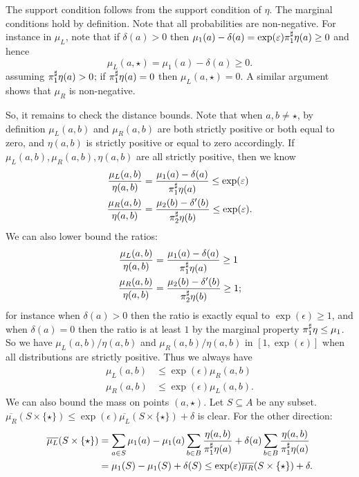 \documentclass{lmcs}
\begin{document}
  The support condition follows from the support condition of $\eta$. The
  marginal conditions hold by definition. Note that all probabilities are
  non-negative. For instance in $\mu_L$, note that if $\delta(a) > 0$ then
  $\mu_1(a) - \delta(a) = \exp(\varepsilon) \pi_{1}^{\sharp} \eta(a) \geq 0$ and hence
  \[
    \mu_L(a, \star) = \mu_1(a) - \delta(a) \geq 0 .
  \]
  assuming $\pi_{1}^{\sharp}\eta(a) > 0$; if $\pi_{1}^{\sharp}\eta(a) = 0$ then $\mu_L(a, \star) = 0$.
  A similar argument shows that $\mu_R$ is non-negative.
  
  So, it remains to check the distance bounds.  Note that when $a, b \neq
  \star$, by definition $\mu_L(a, b)$ and $\mu_R(a, b)$ are both strictly
  positive or both equal to zero, and $\eta(a, b)$ is strictly positive or equal
  to zero accordingly. If $\mu_L(a, b), \mu_R(a, b), \eta(a, b)$ are all
  strictly positive, then we know
  \begin{align*}
    \frac{\mu_L(a, b)}{\eta(a, b)}
    &= \frac{\mu_1(a) - \delta(a)}{\pi_{1}^{\sharp}\eta(a)}
    \leq \exp(\varepsilon) \\
    \frac{\mu_R(a, b)}{\eta(a, b)}
    &= \frac{\mu_2(b) - \delta'(b)}{\pi_{2}^{\sharp}\eta(b)}
    \leq \exp(\varepsilon) .
  \end{align*}
  We can also lower bound the ratios:
  \begin{align*}
    \frac{\mu_L(a, b)}{\eta(a, b)}
    &= \frac{\mu_1(a) - \delta(a)}{\pi_{1}^{\sharp}\eta(a)}
    \geq 1 \\
    \frac{\mu_R(a, b)}{\eta(a, b)}
    &= \frac{\mu_2(b) - \delta'(b)}{\pi_{2}^{\sharp}\eta(b)}
    \geq 1 ;
  \end{align*}
  for instance when $\delta(a) > 0$ then the ratio is exactly equal to
  $\exp(\epsilon) \geq 1$, and when $\delta(a) = 0$ then the ratio is at least
  $1$ by the marginal property $\pi_{1}^{\sharp}\eta \leq \mu_1$.
  So we have $\mu_L(a, b)/\eta(a, b)$ and $\mu_R(a, b)/\eta(a, b)$ in $[1,
  \exp(\epsilon)]$ when all distributions are strictly positive. Thus we always
  have
  \begin{align*}
    \mu_L(a, b) &\leq \exp(\epsilon) \mu_R(a, b) \\
    \mu_R(a, b) &\leq \exp(\epsilon) \mu_L(a, b) .
  \end{align*}
  We can also bound the mass on points $(a, \star)$. Let $S \subseteq A$ be
  any subset. $\overline{\mu_R}(S \times \{ \star \}) \leq \exp(\epsilon)
  \overline{\mu_L}(S \times \{ \star \}) + \delta$ is clear. For the other
  direction:
  \begin{align*}
    \overline{\mu_L}(S \times \{ \star \}) &= \sum_{a \in S} \mu_1(a)
    - \mu_1(a) \sum_{b \in B} \frac{\eta(a, b)}{\pi_{1}^{\sharp} \eta(a)}
    + \delta(a) \sum_{b \in B} \frac{\eta(a, b)}{\pi_{1}^{\sharp} \eta(a)} \\
    &= \mu_1(S) - \mu_1(S) + \delta(S)
    \leq \exp(\varepsilon) \overline{\mu_R}(S \times \{ \star \}) + \delta .
  \end{align*}
\end{document}
